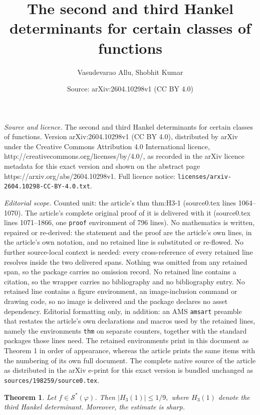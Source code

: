 \documentclass[10pt,a4paper]{amsart}
\title{{The second and third Hankel determinants for certain classes of functions}}
\author{Vasudevarao Allu, Shobhit Kumar}
\date{Source: arXiv:2604.10298v1 (CC BY 4.0)}
\newtheorem{thm}{Theorem}
\begin{document}
\maketitle

\noindent\emph{Source and licence.} {The second and third Hankel determinants for certain classes of functions}. Version arXiv:2604.10298v1 (CC BY 4.0), distributed by arXiv under the Creative Commons Attribution 4.0 International licence, http://creativecommons.org/licenses/by/4.0/, as recorded in the arXiv licence metadata for this exact version and shown on the abstract page https://arxiv.org/abs/2604.10298v1. Full licence notice: \texttt{licenses/arxiv-2604.10298-CC-BY-4.0.txt}.\par\smallskip

\noindent\textit{Editorial scope.} Counted unit: the article's thm thm:H3-1 (source0.tex lines 1064--1070). The article's complete original proof of it is delivered with it (source0.tex lines 1071--1866, one \texttt{proof} environment of 796 lines). No mathematics is written, repaired or re-derived: the statement and the proof are the article's own lines, in the article's own notation, and no retained line is substituted or re-flowed.  No further source-local context is needed: every cross-reference of every retained line resolves inside the two delivered spans.  Nothing was omitted from any retained span, so the package carries no omission record.  No retained line contains a citation, so the wrapper carries no bibliography and no bibliography entry.  No retained line contains a figure environment, an image-inclusion command or drawing code, so no image is delivered and the package declares no asset dependency.  Editorial formatting only, in addition: an AMS \texttt{amsart} preamble that restates the article's own declarations and macros used by the retained lines, namely the environments \texttt{thm} on separate counters, together with the standard packages those lines need.  The retained environments print in this document as Theorem 1 in order of appearance, whereas the article prints the same items with the numbering of its own full document.  The complete native source of the article as distributed in the arXiv e-print for this exact version is bundled unchanged as \texttt{sources/198259/source0.tex}.
\begin{thm}\label{thm:H3-1}
Let $f\in \mathcal{S}^*(\varphi)$. Then
$
|H_3(1)|\leq {1}/{9},
$
where $H_3(1)$ denote the third Hankel determinant. Moreover, the estimate is sharp.
\end{thm}
\end{document}

